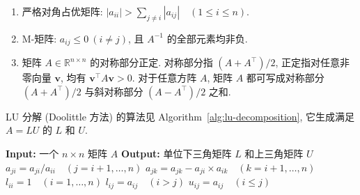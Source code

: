 \begin{enumerate}
\item {严格对角占优矩阵:} $|a_{ii}|>\sum_{j\ne i}|a_{ij}|\quad(1\le i\le n)$.
\item {M-矩阵: $a_{ij}\le0\ (i\ne j)$, 且 $A^{-1}$ 的全部元素均非负.}
\item {矩阵 $A\in\mathbb R^{n\times n}$ 的对称部分正定. 对称部分指 $(A+A^\top)/2$, 正定指对任意非零向量 $\bm v$, 均有 $\bm v^\top A\bm v>0$. 对于任意方阵 $A$, 矩阵 $A$ 都可写成对称部分 $(A+A^\top)/2$ 与斜对称部分 $(A-A^\top)/2$ 之和.}
\end{enumerate}
{LU 分解 (Doolittle 方法) 的算法见 Algorithm~\ref{alg:lu-decomposition}, 它生成满足 $A=LU$ 的 $L$ 和 $U$.}
\begin{algorithm}[H]
\caption{{LU 分解}}\label{alg:lu-decomposition}
\begin{algorithmic}[1]
\Statex \textbf{Input:} {一个 $n\times n$ 矩阵 $A$}
\Statex \textbf{Output:} {单位下三角矩阵 $L$ 和上三角矩阵 $U$}
\State $a_{ji}=a_{ji}/a_{ii}\quad(j=i+1,\ldots,n)$
\State $a_{jk}=a_{jk}-a_{ji}\times a_{ik}\quad(k=i+1,\ldots,n)$
\EndFor
\EndFor
\State $l_{ii}=1\quad(i=1,\ldots,n)$
\State $l_{ij}=a_{ij}\quad(i>j)$
\State $u_{ij}=a_{ij}\quad(i\le j)$
\end{algorithmic}
\end{algorithm}
